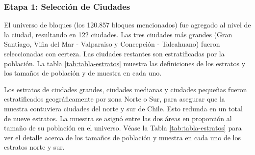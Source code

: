 \documentclass[
  12pt,
]{article}
\begin{document}
\hypertarget{etapa1m1}{%
\subsubsection*{Etapa 1: Selección de Ciudades}\label{etapa1m1}}

El universo de bloques (los 120.857 bloques mencionados) fue agregado al nivel de la ciudad, resultando en 122 ciudades. Las tres ciudades más grandes (Gran Santiago, Viña del Mar - Valparaiso y Concepción - Talcahuano) fueron seleccionadas con certeza. Las ciudades restantes son estratificadas por la población. La tabla \ref{tab:tabla-estratos} muestra las definiciones de los estratos y los tamaños de población y de muestra en cada uno.

\begin{table}[H]

\caption{\label{tab:tabla-estratos}Población por ciudad y tamaños de muestra, por estrato}
\centering
{}
\end{table}

Los estratos de ciudades grandes, ciudades medianas y ciudades pequeñas fueron estratificados geográficamente por zona Norte o Sur, para asegurar que la muestra contuviera ciudades del norte y sur de Chile. Esto redunda en un total de nueve estratos. La muestra se asignó entre las dos áreas en proporción al tamaño de su población en el universo. Véase la Tabla \ref{tab:tabla-estratos} para ver el detalle acerca de los tamaños de población y muestra en cada uno de los estratos norte y sur.
\end{document}
